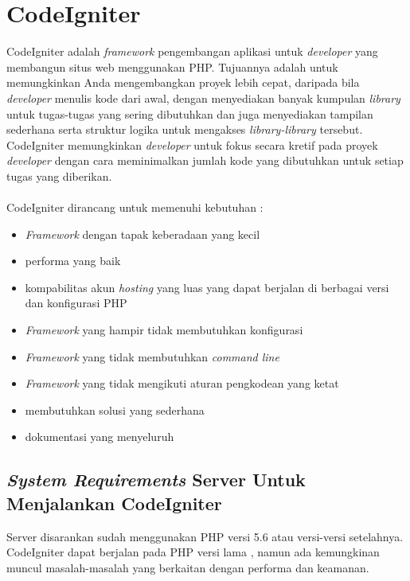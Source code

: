 \section{CodeIgniter}
\label{sec:CodeIgniter}  
CodeIgniter adalah \textit{framework} pengembangan aplikasi untuk \textit{developer} yang membangun situs web menggunakan PHP. Tujuannya adalah untuk memungkinkan Anda mengembangkan proyek lebih cepat, daripada bila \textit{developer} menulis kode dari awal, dengan menyediakan banyak kumpulan \textit{library} untuk tugas-tugas yang sering dibutuhkan dan juga menyediakan tampilan sederhana serta struktur logika untuk mengakses \textit{library-library} tersebut. CodeIgniter memungkinkan \textit{developer} untuk fokus secara kretif pada proyek \textit{developer} dengan cara meminimalkan jumlah kode yang dibutuhkan untuk setiap tugas yang diberikan. \cite{CodeIgniter:17}
\\
\\
CodeIgniter dirancang untuk memenuhi kebutuhan :
\begin{itemize}
		\item \textit{Framework} dengan tapak keberadaan yang kecil
		\item performa yang baik
		\item kompabilitas akun \textit{hosting} yang luas yang dapat berjalan di berbagai versi dan konfigurasi PHP
		\item \textit{Framework} yang hampir tidak membutuhkan konfigurasi
		\item \textit{Framework} yang tidak membutuhkan \textit{command line}
		\item \textit{Framework} yang tidak mengikuti aturan pengkodean yang ketat
		\item membutuhkan solusi yang sederhana
		\item dokumentasi yang menyeluruh
	\end{itemize}
	
\subsection{\textit{System Requirements} Server Untuk Menjalankan CodeIgniter}
Server disarankan sudah menggunakan PHP versi 5.6 atau versi-versi setelahnya. CodeIgniter dapat berjalan pada PHP versi lama , namun ada kemungkinan muncul masalah-masalah yang berkaitan dengan performa dan keamanan.

